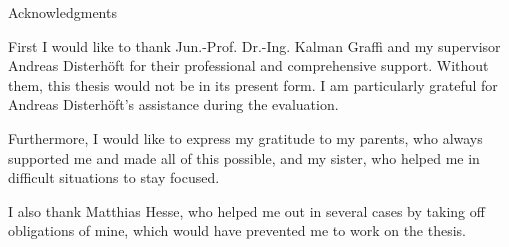 
\begin{center} 


\huge Acknowledgments

\end{center}

First I would like to thank Jun.-Prof. Dr.-Ing. Kalman Graffi and my supervisor Andreas Disterhöft for their professional and comprehensive support. Without them, this thesis would not be in its present form. I am particularly grateful for Andreas Disterhöft's assistance during the evaluation.

Furthermore, I would like to express my gratitude to my parents, who always supported me and made all of this possible, and my sister, who helped me in difficult situations to stay focused.

I also thank Matthias Hesse, who helped me out in several cases by taking off obligations of mine, which would have prevented me to work on the thesis.

